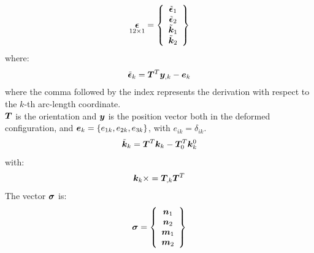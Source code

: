 \begin{equation}
\underset{ 12 \times 1 }{
 \T{\epsilon}
 } =
\cubr{\vvect{c}{
 \tilde{\T{\epsilon}}_1 \\
 \tilde{\T{\epsilon}}_2 \\
 \tilde{\T{k} }_1 \\
 \tilde{\T{k} }_2 \\
}}
\end{equation}
where:
\begin{equation}
\tilde{\T{\epsilon}}_k =
\T{T} ^T \T{y}_{,k}  - \T{e}_k
\label{eq:epsilon}
\end{equation}
where the comma followed by the index represents the derivation with respect to the $k$-th arc-length coordinate.\\
$\T{T}$ is the orientation and $\T{y}$ is the position vector both in the deformed configuration, and $\T{e}_k=\{e_{1k},e_{2k},e_{3k}\}$, with
$e_{ik}=\delta_{ik}$.
\begin{equation}
\tilde{\T{k}}_k  =
\T{T}^ T \T{k}_k  - \T{T}_0 ^ T  \T{k}^{0}_{k}
\end{equation}
with:
\begin{equation}
\T{k}_k  \times = \T{T}_{,k} \T{T}^T
\end{equation}
The vector $\T{\sigma}$ is:
\begin{equation}
 \T{\sigma} =
\cubr{\vvect{c}{
 \T{n}_1 \\
 \T{n}_2 \\
 \T{m}_1 \\
 \T{m}_2 \\
}}
\end{equation}
